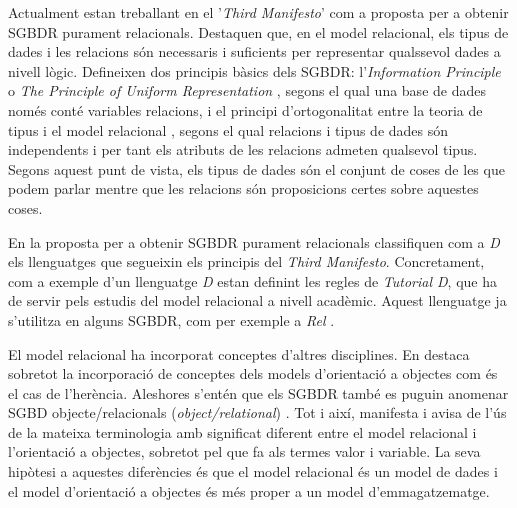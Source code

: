 Actualment \textcite{date:thethirdmanifesto} estan treballant en el
'\emph{Third Manifesto}' com a proposta per a obtenir SGBDR purament
relacionals. Destaquen que, en el model relacional, els tipus de dades
i les relacions són necessaris i suficients per representar qualssevol
dades a nivell lògic. %
Defineixen dos principis bàsics dels SGBDR: l'\emph{Information
  Principle} o \emph{The Principle of Uniform
  Representation} \parencite{date:dictionary}, segons el qual una base
de dades només conté variables relacions, i el principi
d'ortogonalitat entre la teoria de tipus i el model
relacional \parencite[cap.~6]{date06}, segons el qual relacions i
tipus de dades són independents i per tant els atributs de les
relacions admeten qualsevol tipus.  Segons aquest punt de vista, els
tipus de dades són el conjunt de coses de les que podem parlar mentre que les
relacions són proposicions certes sobre aquestes coses.

En la proposta per a obtenir SGBDR purament relacionals
\textcite{date06:_datab_types_relat_model,date:tutoriald} classifiquen
com a \emph{D} els llenguatges que segueixin els principis del
\emph{Third Manifesto}. Concretament, com a exemple d'un llenguatge
\emph{D} estan definint les regles de \emph{Tutorial D}, que ha de
servir pels estudis del model relacional a nivell acadèmic. Aquest
llenguatge ja s'utilitza en alguns SGBDR, com per exemple a
\emph{Rel} \parencite{rel}.


El model relacional ha incorporat conceptes d'altres disciplines. En
destaca sobretot la incorporació de conceptes dels models d'orientació
a objectes com és el cas de l'herència.  Aleshores s'entén que els
SGBDR també es puguin anomenar SGBD objecte/relacionals
(\emph{object/relational})
\parencite{date02:foundation}.  Tot i així, \textcite[cap.~6]{date06}
manifesta i avisa de l'ús de la mateixa terminologia amb significat
diferent entre el model relacional i l'orientació a objectes, sobretot
pel que fa als termes valor i variable. %
La seva hipòtesi a aquestes diferències és que el model relacional és
un model de dades i el model d'orientació a objectes és més proper a
un model
d'emmagatzematge. %

